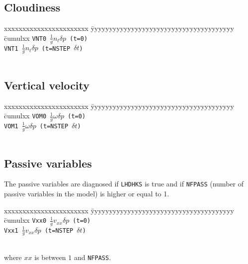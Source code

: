 \subsection{Cloudiness}


\begin{tabbing}
xxxxxxxxxxxxxxxxxxxxxxx \= yyyyyyyyyyyyyyyyyyyyyyyyyyyyyyyyyyyyyyy \= cumulxx \kill
\tt VNT0 \> $\frac{1}{g}n_t \delta p$ (t=0) \\[1ex]
\tt VNT1 \> $\frac{1}{g}n_t \delta p$ (t=NSTEP $\delta t$) \\[1ex]
\\[1ex]
\end{tabbing}

\subsection{Vertical velocity}

\begin{tabbing}
xxxxxxxxxxxxxxxxxxxxxxx \= yyyyyyyyyyyyyyyyyyyyyyyyyyyyyyyyyyyyyyy \= cumulxx \kill
\tt VOM0 \> $\frac{1}{g}\omega \delta p$ (t=0) \\[1ex]
\tt VOM1 \> $\frac{1}{g}\omega \delta p$ (t=NSTEP $\delta t$) \\[1ex]
\\[1ex]
\end{tabbing}

\subsection{Passive variables}

The passive variables are diagnosed if {\tt LHDHKS} is true and if {\tt NFPASS} (number of passive variables in the model) is higher or equal to 1.

 
\begin{tabbing}
xxxxxxxxxxxxxxxxxxxxxxx \= yyyyyyyyyyyyyyyyyyyyyyyyyyyyyyyyyyyyyyy \= cumulxx \kill
\tt Vxx0 \> $\frac{1}{g} v_{xx} \delta p$ (t=0) \\[1ex]
\tt Vxx1 \> $\frac{1}{g} v_{xx} \delta p$ (t=NSTEP $\delta t$) \\[1ex]
\\[1ex]
\end{tabbing}
where $xx$ is between $1$ and {\tt NFPASS}.

